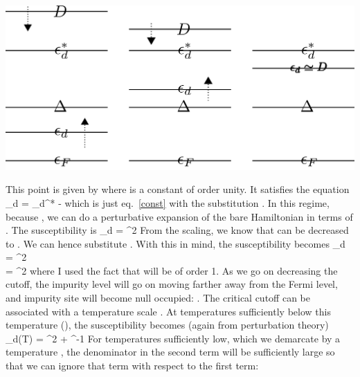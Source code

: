 \documentclass[14pt]{extarticle}
\numberwithin{equation}{section}
\begin{document}
\begin{center} \includegraphics[scale=0.29]{full.png}\end{center}
This point is given by  where  is a constant of order unity. It satisfies the equation
\beq[eraser]
\ol \epsilon_d = \epsilon_d^* - \fr{\Delta}{\pi}\ln {}
\eeq
which is just eq.~\ref{const} with the substitution . In this regime, because , we can do a perturbative expansion of the  bare Hamiltonian in terms of . The susceptibility is
\beq
\chi_d = \fr{\Delta}{2\pi}^2
\eeq
From the scaling, we know that  can be decreased to . We can hence substitute . With this in mind, the susceptibility becomes
\beq
\chi_d = \fr{\Delta}{2\pi}^2 \\
= \fr{\Delta}{2\pi}^2
\eeq
where I used the fact that  will be of order 1. As we go on decreasing the cutoff, the impurity level will go on moving farther away from the Fermi level, and impurity site will become null occupied: . The critical cutoff  can be associated with a temperature  scale . At temperatures sufficiently below this temperature (), the susceptibility becomes (again from perturbation theory)
\beq
\chi_d(T) = \fr{\Delta}{2\pi}^2 + ^{-1}
\eeq
For temperatures sufficiently low, which we demarcate by a temperature , the denominator in the second term will be sufficiently large so that we can ignore that term with respect to the first term:
\end{document}
